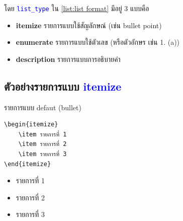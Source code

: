 โดย \textcolor{blue}{\texttt{list\_type}} ใน \autoref{list:list format} มีอยู่ 3 แบบคือ

\begin{itemize}[noitemsep]
    \item \textbf{\color{blue}itemize} รายการแบบใช้สัญลักษณ์ (เช่น bullet point)
    \item \textbf{\color{blue}enumerate} รายการแบบใช้ตัวเลข (หรือตัวอักษร เช่น 1. (a))
    \item \textbf{\color{blue}description} รายการแบบการอธิบายคำ
\end{itemize}


\subsection{ตัวอย่างรายการแบบ \textcolor{blue}{itemize}}

\begin{exampleBox}[sidebyside]{รายการแบบ defaut (bullet)}
\begin{lstlisting}[frame=none,language={[LaTeX]TeX}]
\begin{itemize}
    \item รายการที่ 1
    \item รายการที่ 2
    \item รายการที่ 3
\end{itemize}
\end{lstlisting}
\tcblower
\begin{itemize}[noitemsep]
    \item รายการที่ 1
    \item รายการที่ 2
    \item รายการที่ 3
\end{itemize}
\end{exampleBox}


